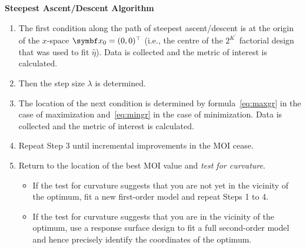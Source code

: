 \begin{framed}
      \textbf{Steepest Ascent/Descent Algorithm}
      \begin{enumerate}[1.]
            \item The first condition along the path of steepest ascent/descent is at the origin of the $x$-space
                  $ \Vector{x}_0=(0,0)^\top $ (i.e., the centre of the $ 2^{K^\prime} $ factorial design that was used to fit $ \hat{\eta} $).
                  Data is collected and the metric of interest is calculated.
            \item Then the step size $ \lambda $ is determined.
            \item The location of the next condition is determined by formula~\ref{eq:maxgr} in the case of maximization and~\ref{eq:mingr} in the case of minimization. Data is collected and the metric of interest is calculated.
            \item Repeat Step 3 until incremental improvements in the MOI cease.
            \item Return to the location of the best MOI value and \emph{test for curvature}.
                  \begin{itemize}[$\rightarrow$]
                        \item If the test for curvature suggests that you are not yet in the vicinity of the optimum, fit a
                              new first-order model and repeat Steps 1 to 4.
                        \item If the test for curvature suggests that you are in the vicinity of the optimum, use a response
                              surface design to fit a full second-order model and hence precisely identify the coordinates of
                              the optimum.
                  \end{itemize}
      \end{enumerate}
\end{framed}
